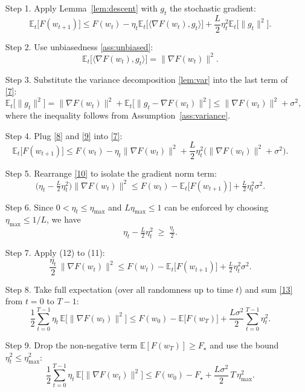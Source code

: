 \documentclass{article}
\newcommand{\EE}{\mathbb{E}}
\begin{document}
\begin{enumerate}
\item[Step 1.] Apply Lemma~\ref{lem:descent} with $g_t$ the stochastic gradient:
\[
\EE_t\!\bigl[F(w_{t+1})\bigr]
\le F(w_t)-\eta_t\EE_t\!\bigl[\langle\nabla F(w_t),g_t\rangle\bigr]
+\frac{L}{2}\eta_t^{2}\EE_t\!\bigl[\|g_t\|^{2}\bigr].
\tag{7}
\]

\item[Step 2.] Use unbiasedness \eqref{ass:unbiased}:
\[
\EE_t\!\bigl[\langle\nabla F(w_t),g_t\rangle\bigr]
= \|\nabla F(w_t)\|^{2}.
\tag{8}
\]

\item[Step 3.] Substitute the variance decomposition \eqref{lem:var} into the last term of \eqref{7}:
\[
\EE_t\!\bigl[\|g_t\|^{2}\bigr]
= \|\nabla F(w_t)\|^{2}+ \EE_t\!\bigl[\|g_t-\nabla F(w_t)\|^{2}\bigr]
\le \|\nabla F(w_t)\|^{2}+ \sigma^{2},
\tag{9}
\]
where the inequality follows from Assumption~\ref{ass:variance}.

\item[Step 4.] Plug \eqref{8} and \eqref{9} into \eqref{7}:
\[
\EE_t\!\bigl[F(w_{t+1})\bigr]
\le F(w_t)-\eta_t\|\nabla F(w_t)\|^{2}
+\frac{L}{2}\eta_t^{2}\bigl(\|\nabla F(w_t)\|^{2}+ \sigma^{2}\bigr).
\tag{10}
\]

\item[Step 5.] Rearrange \eqref{10} to isolate the gradient norm term:
\[
\bigl(\eta_t-\tfrac{L}{2}\eta_t^{2}\bigr)\|\nabla F(w_t)\|^{2}
\le F(w_t)-\EE_t\!\bigl[F(w_{t+1})\bigr]
+\tfrac{L}{2}\eta_t^{2}\sigma^{2}.
\tag{11}
\]

\item[Step 6.] Since $0<\eta_t\le\eta_{\max}$ and $L\eta_{\max}\le 1$ can be enforced
by choosing $\eta_{\max}\le 1/L$, we have
\[
\eta_t-\tfrac{L}{2}\eta_t^{2}\;\ge\;\tfrac{\eta_t}{2}.
\tag{12}
\]

\item[Step 7.] Apply (12) to (11):
\[
\frac{\eta_t}{2}\,\|\nabla F(w_t)\|^{2}
\le F(w_t)-\EE_t\!\bigl[F(w_{t+1})\bigr]
+\tfrac{L}{2}\eta_t^{2}\sigma^{2}.
\tag{13}
\]

\item[Step 8.] Take full expectation (over all randomness up to time $t$) and sum
\eqref{13} from $t=0$ to $T-1$:
\[
\frac{1}{2}\sum_{t=0}^{T-1}\eta_t\,\EE\bigl[\|\nabla F(w_t)\|^{2}\bigr]
\le F(w_0)-\EE\bigl[F(w_T)\bigr]
+\frac{L\sigma^{2}}{2}\sum_{t=0}^{T-1}\eta_t^{2}.
\tag{14}
\]

\item[Step 9.] Drop the non‑negative term $\EE[F(w_T)]\ge F_\star$ and use the bound
$\eta_t^{2}\le \eta_{\max}^{2}$:
\[
\frac{1}{2}\sum_{t=0}^{T-1}\eta_t\,\EE\bigl[\|\nabla F(w_t)\|^{2}\bigr]
\le F(w_0)-F_\star
+\frac{L\sigma^{2}}{2}\,T\,\eta_{\max}^{2}.
\tag{15}
\]


\end{enumerate}
\end{document}
